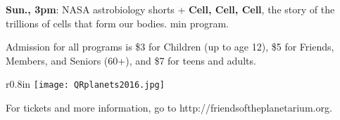 \documentclass{article}
\begin{document}

     {\fontsize{19}{19}

     \textbf{Sun., 3pm}: NASA astrobiology shorts +
     \textbf{Cell, Cell, Cell}, the story of the trillions of cells that form our bodies.
      \fontsize{11}{19} min program.

     }





   {\fontsize{16}{18}

Admission for all programs is \$3 for Children (up to age 12), \$5 for Friends, Members, and Seniors (60+), and \$7 for teens and adults.

   }



   {\fontsize{18}{24}

\begin{wrapfigure}{r}{0.8in}
   \texttt{[image: QRplanets2016.jpg]}
\end{wrapfigure}      

\begin{centering}
  
For tickets and more information, go to\break
http://friendsoftheplanetarium.org.

\end{centering}

}



\end{document}

